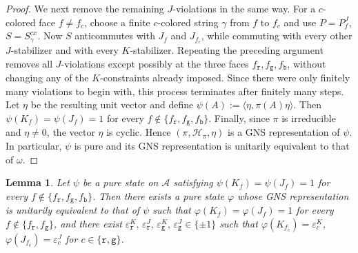 \documentclass[a4paper,11pt]{article}
\newtheorem{lemma}[theorem]{Lemma}
\theoremstyle{definition}
\theoremstyle{remark}
\theoremstyle{remark}
\begin{document}
\begin{proof}
    We next remove the remaining $J$-violations in the same way. For a $c$-colored face $f\neq f_{c}$, choose a finite $c$-colored string $\gamma$ from $f$ to $f_{c}$ and use $P=P_f^J$, $S=S_\gamma^{cx}$. Now $S$ anticommutes with $J_f$ and $J_{f_{c}}$, while commuting with every other $J$-stabilizer and with every $K$-stabilizer. Repeating the preceding argument removes all $J$-violations except possibly at the three faces $f_{\mathtt r},f_{\mathtt g},f_{\mathtt b}$, without changing any of the $K$-constraints already imposed. Since there were only finitely many violations to begin with, this process terminates after finitely many steps. Let $\eta$ be the resulting unit vector and define $\psi(A):=\langle\eta,\pi(A)\eta\rangle$. Then $\psi(K_f)=\psi(J_f)=1$ for every $f\notin\{f_{\mathtt r},f_{\mathtt g},f_{\mathtt b}\}$. Finally, since $\pi$ is irreducible and $\eta\neq0$, the vector $\eta$ is cyclic. Hence $(\pi,\mathcal H_\pi,\eta)$ is a GNS representation of $\psi$. In particular, $\psi$ is pure and its GNS representation is unitarily equivalent to that of $\omega$.
\end{proof}

\begin{lemma}\label{lem:definite_local_syndrome}
    Let $\psi$ be a pure state on $\mathcal A$ satisfying $\psi(K_f)=\psi(J_f)=1$ for every $f\notin\{f_{\mathtt r},f_{\mathtt g},f_{\mathtt b}\}$. Then there exists a pure state $\varphi$ whose GNS representation is unitarily equivalent to that of $\psi$ such that $\varphi(K_f)=\varphi(J_f)=1$ for every $f\notin\{f_{\mathtt r},f_{\mathtt g}\}$, and there exist $\varepsilon_{\mathtt r}^K,\, \varepsilon_{\mathtt r}^J,\,\varepsilon_{\mathtt g}^K,\, \varepsilon_{\mathtt g}^J \in\{\pm1\}$ such that $\varphi(K_{f_{c}})=\varepsilon_{c}^K$, $\varphi(J_{f_{c}})=\varepsilon_{c}^J$ for $c\in\{\mathtt r,\mathtt g\}$. 
\end{lemma}
\end{document}
